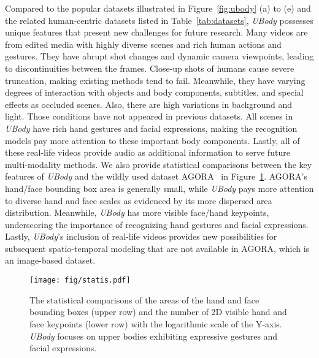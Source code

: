 \documentclass[10pt,twocolumn,letterpaper]{article}
\newcommand{\dataname}{\emph{UBody}\xspace}
\begin{document}
Compared to the popular datasets illustrated in Figure~\ref{fig:ubody} (a) to (e) and the related human-centric datasets listed in Table~\ref{tab:datasets}, \dataname possesses unique features that present new challenges for future research.
Many videos are from edited media with highly diverse scenes and rich human actions and gestures. They have abrupt shot changes and dynamic camera viewpoints, leading to discontinuities between the frames. Close-up shots of humans cause severe truncation, making existing methods tend to fail. Meanwhile, they have varying degrees of interaction with objects and body components, subtitles, and special effects as occluded scenes. Also, there are high variations in background and light. Those conditions have not appeared in previous datasets.
All scenes in \dataname have rich hand gestures and facial expressions, making the recognition models pay more attention to these important body components. Lastly, all of these real-life videos provide audio as additional information to serve future multi-modality methods.
We also provide statistical comparisons between the key features of \dataname and the wildly used dataset AGORA~\cite{Patel_2021agora} in Figure~\ref{fig:statis}.
AGORA's hand/face bounding box area is generally small, while \dataname pays more attention to diverse hand and face scales as evidenced by its more dispersed area distribution. Meanwhile, \dataname has more visible face/hand keypoints, underscoring the importance of recognizing hand gestures and facial expressions. Lastly, \dataname's inclusion of  real-life videos provides new possibilities for subsequent spatio-temporal modeling that are not available in AGORA, which is an image-based dataset.


\vspace{-0.3cm}
\begin{figure}[t]
\begin{center}
\texttt{[image: fig/statis.pdf]}
\end{center}
\vspace{-0.6cm}
\caption{The statistical comparisons of the areas of the hand and face bounding boxes (upper row) and the number of 2D visible hand and face keypoints (lower row) with the logarithmic scale of the Y-axis. \dataname focuses on upper bodies exhibiting expressive gestures and facial expressions. 
}
\label{fig:statis}
\vspace{-0.6cm}
\end{figure}
\end{document}
